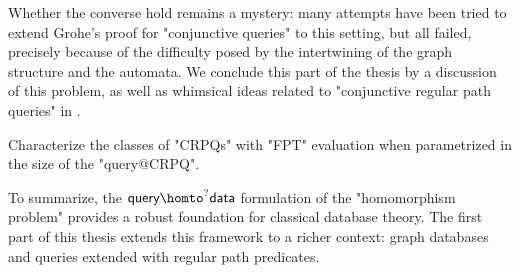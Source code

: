 Whether the converse hold remains a mystery: many attempts
have been tried to extend Grohe's proof for "conjunctive queries" to this setting,
but all failed, precisely because of the difficulty posed
by the intertwining of the graph structure and the automata.
We conclude this part of the thesis by a discussion of this problem,
as well as whimsical ideas related to "conjunctive regular path queries"
in .

\begin{openproblemintro}
	Characterize the classes of "CRPQs" with "FPT" evaluation
	when parametrized in the size of the "query@CRPQ".
\end{openproblemintro}

To summarize, the $\textsf{query} \homto^? \textsf{data}$ formulation of the "homomorphism problem" provides a robust foundation for classical database theory. The first part of this thesis extends this framework to a richer context: graph databases and queries extended with regular path predicates.